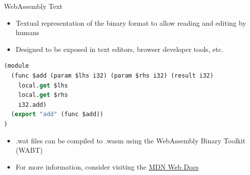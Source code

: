 \documentclass{beamer}
\begin{document}
\begin{frame}[fragile]{WebAssembly Text}
    \begin{itemize}
        \item Textual representation of the binary format to allow reading and editing by humans
        \item Designed to be exposed in text editors, browser developer tools, etc.
    \end{itemize}
    \begin{lstlisting}[language=Lisp,basicstyle=\footnotesize]
(module
  (func $add (param $lhs i32) (param $rhs i32) (result i32)
    local.get $lhs
    local.get $rhs
    i32.add)
  (export "add" (func $add))
)
    \end{lstlisting}
    \begin{itemize}
        \item .wat files can be compiled to .wasm using the WebAssembly Binary Toolkit (WABT)
        \item For more information, consider visiting the \href{https://developer.mozilla.org/en-US/docs/WebAssembly/Understanding_the_text_format}{MDN Web Docs}
    \end{itemize}
\end{frame}
\end{document}
